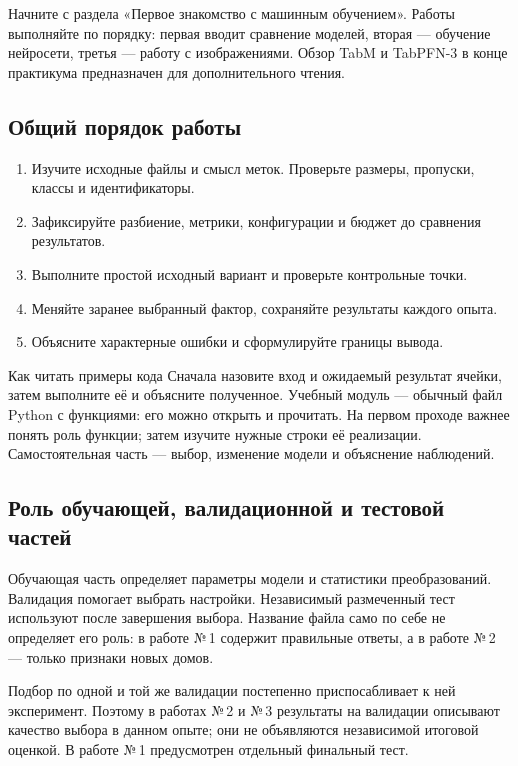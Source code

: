 Начните с раздела «Первое знакомство с машинным обучением». Работы выполняйте по порядку: первая вводит сравнение моделей, вторая --- обучение нейросети, третья --- работу с изображениями. Обзор TabM и TabPFN-3 в конце практикума предназначен для дополнительного чтения.

\subsection*{Общий порядок работы}
\begin{enumerate}
\item Изучите исходные файлы и смысл меток. Проверьте размеры, пропуски, классы и идентификаторы.
\item Зафиксируйте разбиение, метрики, конфигурации и бюджет до сравнения результатов.
\item Выполните простой исходный вариант и проверьте контрольные точки.
\item Меняйте заранее выбранный фактор, сохраняйте результаты каждого опыта.
\item Объясните характерные ошибки и сформулируйте границы вывода.
\end{enumerate}

\begin{keybox}{Как читать примеры кода}
Сначала назовите вход и ожидаемый результат ячейки, затем выполните её и объясните полученное. Учебный модуль --- обычный файл Python с функциями: его можно открыть и прочитать. На первом проходе важнее понять роль функции; затем изучите нужные строки её реализации. Самостоятельная часть --- выбор, изменение модели и объяснение наблюдений.
\end{keybox}

\subsection*{Роль обучающей, валидационной и тестовой частей}
Обучающая часть определяет параметры модели и статистики преобразований. Валидация помогает выбрать настройки. Независимый размеченный тест используют после завершения выбора. Название файла само по себе не определяет его роль: в работе №\,1  содержит правильные ответы, а в работе №\,2 --- только признаки новых домов.

Подбор по одной и той же валидации постепенно приспосабливает к ней эксперимент. Поэтому в работах №\,2 и №\,3 результаты на валидации описывают качество выбора в данном опыте; они не объявляются независимой итоговой оценкой. В работе №\,1 предусмотрен отдельный финальный тест.
